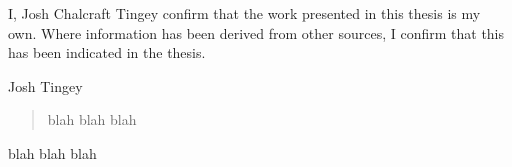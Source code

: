 
\begin{declaration} %
    I, Josh Chalcraft Tingey confirm that the work presented in this thesis is my own. Where
    information has been derived from other sources, I confirm that this has been indicated in the
    thesis.
    \vspace*{1cm}
    \begin{flushright}
        Josh Tingey
    \end{flushright}
\end{declaration}

\begin{abstract} %
    blah blah blah
\end{abstract}

\begin{acknowledgements} %
    blah blah blah
\end{acknowledgements}

\tableofcontents %
\thispagestyle{empty} %